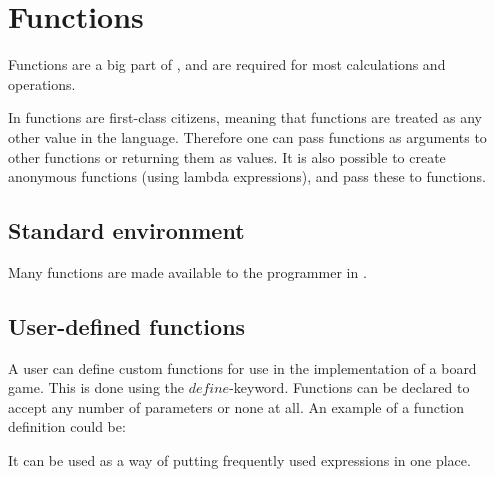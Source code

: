 \section{Functions}
\label{sec:functions}

Functions are a big part of \productname, and are required for most calculations and operations.

In \productname functions are first-class citizens, meaning that functions are treated
as any other value in the language. Therefore one can pass functions as
arguments to other functions or returning them as values. It is also possible to create
anonymous functions (using lambda expressions), and pass these to functions.

\subsection{Standard environment}

Many functions are made available to the programmer in \productname.

\subsection{User-defined functions}

A user can define custom functions for use in the implementation of a board game.
This is done using the $define$-keyword. Functions can be declared to accept
any number of parameters or none at all. An example of a function definition could
be:


It can be used as a way of putting frequently used expressions in one place. 
